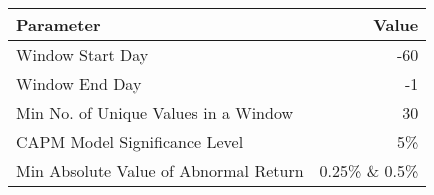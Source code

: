 \documentclass[border=0.2cm]{standalone}
\begin{document}
\begin{tabular}{lr}
    Parameter                             & Value           \\
    \toprule
    Window Start Day                      & -60             \\
    Window End Day                        & -1              \\
    Min No. of Unique Values in a Window  & 30              \\
    CAPM Model Significance Level         & 5\%             \\
    Min Absolute Value of Abnormal Return & 0.25\% \& 0.5\% \\
    \bottomrule
\end{tabular}
\end{document}
